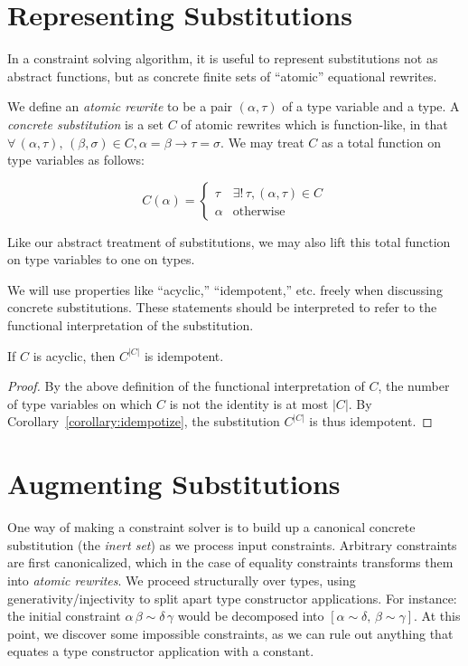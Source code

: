 \documentclass[10pt, letterpaper, oneside]{article}
\begin{document}
\section{Representing Substitutions}

In a constraint solving algorithm, it is useful to represent substitutions not as abstract functions, but as concrete finite sets of ``atomic'' equational rewrites.

We define an \emph{atomic rewrite} to be a pair \((\alpha, \tau)\) of a type variable and a type. A \emph{concrete substitution} is a set \(C\) of atomic rewrites which is function-like, in that \(\forall\, (\alpha, \tau),\,(\beta, \sigma) \in C, \alpha = \beta \to \tau = \sigma\). We may treat \(C\) as a total function on type variables as follows:

\begin{equation*}
  C(\alpha) =
  \begin{cases}
    \tau & \exists!\, \tau, (\alpha, \tau) \in C\\
    \alpha & \textrm{otherwise}
  \end{cases}
\end{equation*}

Like our abstract treatment of substitutions, we may also lift this total function on type variables to one on types.

We will use properties like ``acyclic,'' ``idempotent,'' etc. freely when discussing concrete substitutions. These statements should be interpreted to refer to the functional interpretation of the substitution.

\begin{corollary}
  If \(C\) is acyclic, then \(C^{|C|}\) is idempotent.
\end{corollary}

\begin{proof}
  By the above definition of the functional interpretation of \(C\), the number of type variables on which \(C\) is not the identity is at most \(|C|\). By Corollary~\ref{corollary:idempotize}, the substitution \(C^{|C|}\) is thus idempotent.
\end{proof}

\section{Augmenting Substitutions}

One way of making a constraint solver is to build up a canonical concrete substitution (the \emph{inert set}) as we process input constraints. Arbitrary constraints are first canonicalized, which in the case of equality constraints transforms them into \emph{atomic rewrites}. We proceed structurally over types, using generativity/injectivity to split apart type constructor applications. For instance: the initial constraint \(\alpha\, \beta \sim \delta\, \gamma\) would be decomposed into \([\alpha \sim \delta,\, \beta \sim \gamma]\). At this point, we discover some impossible constraints, as we can rule out anything that equates a type constructor application with a constant.
\end{document}
